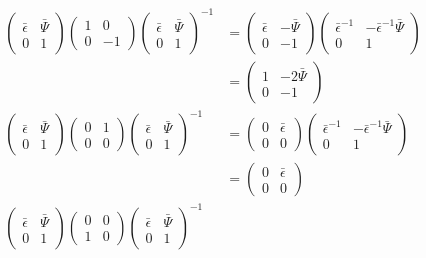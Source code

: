 \documentclass{jsarticle}
\begin{document}
\begin{align*}
\begin{pmatrix}\bar{\epsilon}&\bar{\Psi}\\0&1\end{pmatrix}\begin{pmatrix}1&0\\0&-1\end{pmatrix}\begin{pmatrix}\bar{\epsilon}&\bar{\Psi}\\0&1\end{pmatrix}^{-1}
&=\begin{pmatrix}\bar{\epsilon}&-\bar{\Psi}\\0&-1\end{pmatrix}\begin{pmatrix}\bar{\epsilon}^{-1}&-\bar{\epsilon}^{-1}\bar{\Psi}\\0&1\end{pmatrix}\\
&=\begin{pmatrix}1&-2\bar{\Psi}\\0&-1\end{pmatrix}\\
\begin{pmatrix}\bar{\epsilon}&\bar{\Psi}\\0&1\end{pmatrix}\begin{pmatrix}0&1\\0&0\end{pmatrix}\begin{pmatrix}\bar{\epsilon}&\bar{\Psi}\\0&1\end{pmatrix}^{-1}
&=\begin{pmatrix}0&\bar{\epsilon}\\0&0\end{pmatrix}\begin{pmatrix}\bar{\epsilon}^{-1}&-\bar{\epsilon}^{-1}\bar{\Psi}\\0&1\end{pmatrix}\\
&=\begin{pmatrix}0&\bar{\epsilon}\\0&0\end{pmatrix}\\
\begin{pmatrix}\bar{\epsilon}&\bar{\Psi}\\0&1\end{pmatrix}\begin{pmatrix}0&0\\1&0\end{pmatrix}\begin{pmatrix}\bar{\epsilon}&\bar{\Psi}\\0&1\end{pmatrix}^{-1}

\end{align*}
\end{document}
